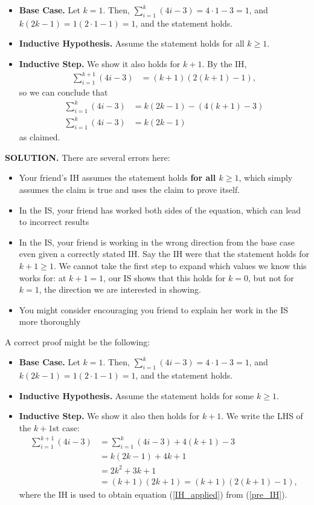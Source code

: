 \documentclass[11pt]{article}
\begin{document}
\begin{itemize}
	\item[]\textbf{Base Case.} Let $k = 1$. Then, $\sum_{i = 1}^k (4i-3) = 4\cdot 1 - 3 = 1$, and $k(2k-1) = 1(2\cdot 1 - 1) = 1$, and the statement holds.
	\item[]\textbf{Inductive Hypothesis.} Assume the statement holds for all $k\geq 1$.
	\item[]\textbf{Inductive Step.} We show it also holds for $k+1$. By the IH,
\begin{align}
	\sum_{i = 1}^{k+1} (4i-3) &= (k+1)(2(k+1)-1),
\end{align}
so we can conclude that
\begin{align}
	\sum_{i=1}^{k}(4i-3) &= k(2k-1) - (4(k+1) - 3)\\
	\sum_{i = 1}^{k} (4i-3) &= k(2k-1)
\end{align}
as claimed.
\end{itemize}
\begin{framed}
\noindent \textbf{SOLUTION.}
There are several errors here:
\begin{itemize}
	\item Your friend's IH assumes the statement holds \textbf{for all $k\geq 1$}, which simply assumes the claim is true and uses the claim to prove itself.
	\item In the IS, your friend has worked both sides of the equation, which can lead to incorrect results
	\item In the IS, your friend is working in the wrong direction from the base case even given a correctly stated IH. Say the IH were that the statement holds for $k + 1 \geq 1$. We cannot take the first step to expand which values we know this works for: at $k + 1 = 1$, our IS shows that this holds for $ k = 0$, but not for $k = 1$, the direction we are interested in showing.
	\item You might consider encouraging you friend to explain her work in the IS more thoroughly
\end{itemize}

\noindent A correct proof might be the following:
\begin{itemize}
	\item[]\textbf{Base Case.} Let $k = 1$. Then, $\sum_{i = 1}^k (4i-3) = 4\cdot 1 - 3 = 1$, and $k(2k-1) = 1(2\cdot 1 - 1) = 1$, and the statement holds.
	\item[]\textbf{Inductive Hypothesis.} Assume the statement holds for some $k\geq 1$.
	\item[]\textbf{Inductive Step.} We show it also then holds for $k+1$. We write the LHS of the $k +1$st case:
	\begin{align}
		\sum_{i = 1}^{k + 1} (4i-3)  &= \sum_{i = 1}^{k} (4i-3) + 4(k + 1)-3\label{pre_IH}\\
		&= k(2k-1) + 4k + 1\label{IH_applied}\\
		&= 2k^2 + 3k +1\\
		&= (k+1)(2k+1) = (k+1)(2(k+1) - 1),
	\end{align}
	where the IH is used to obtain equation (\ref{IH_applied}) from (\ref{pre_IH}).
\end{itemize}
\end{framed}
\newpage
\end{document}
